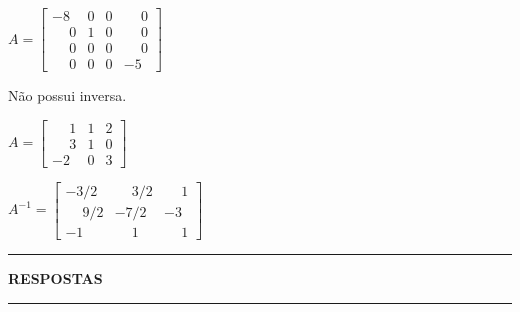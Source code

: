 \documentclass[12pt]{exam}
\begin{document}
\begin{exercicio}
  $
    A =\begin{bmatrix}
        -8 & 0 & 0 & \phantom{-} 0\\
        \phantom{-} 0 & 1 & 0 & \phantom{-} 0\\
        \phantom{-} 0 & 0 & 0 & \phantom{-} 0\\
        \phantom{-} 0 & 0 & 0 & -5
    \end{bmatrix}
  $
  \begin{solucao}
   N\~ao possui inversa.
  \end{solucao}
\end{exercicio}

\begin{exercicio}\label{matrizinversafim}
  $
    A =\begin{bmatrix}
        \phantom{-} 1 & 1 & 2\\
        \phantom{-} 3 & 1 & 0\\
        -2 & 0 & 3
    \end{bmatrix}
  $
  \begin{solucao}
    $
      A^{-1} =\begin{bmatrix}
        -3/2 & \phantom{-} 3/2 & \phantom{-} 1\\
        \phantom{-} 9/2 & -7/2 & -3\\
        -1 & \phantom{-} 1 & \phantom{-} 1
      \end{bmatrix}
    $
  \end{solucao}
\end{exercicio}

\newpage
{}
\hrule
\begin{center}
{\large\bf RESPOSTAS}
\end{center}
\hrule

\end{document}
